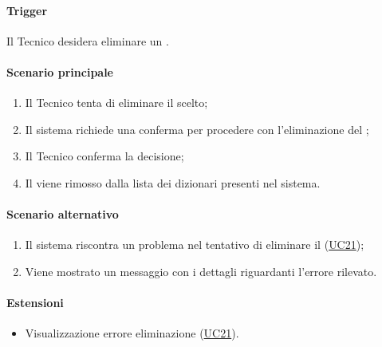 \paragraph*{Trigger}
Il Tecnico desidera eliminare un .

\paragraph*{Scenario principale}
\begin{enumerate}
  \item Il Tecnico tenta di eliminare il  scelto;
  \item Il sistema richiede una conferma per procedere con l'eliminazione del ;
  \item Il Tecnico conferma la decisione;
  \item Il  viene rimosso dalla lista dei dizionari presenti nel sistema.  
\end{enumerate}

\paragraph*{Scenario alternativo}
\begin{enumerate}
  \item Il sistema riscontra un problema nel tentativo di eliminare il  (\hyperref[UC21]{UC21});
  \item Viene mostrato un messaggio con i dettagli riguardanti l'errore rilevato.
\end{enumerate}

\paragraph*{Estensioni}
\begin{itemize}
  \item Visualizzazione errore eliminazione  (\hyperref[UC21]{UC21}).
\end{itemize}